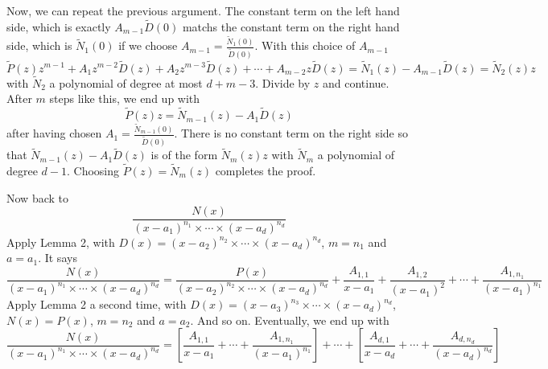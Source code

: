 Now, we can repeat the previous argument. The constant term on the left hand side, which
is exactly $A_{m-1} \tilde{D}(0)$ matchs the constant term on the right hand side, which is $\tilde{N}_1(0)$ if we
choose $A_{m-1} = \frac{\tilde{N}_1(0)}{\tilde{D}(0)}$. With this choice of $A_{m-1}$
\[
\tilde{P}(z)z^{m-1} + A_1 z^{m-2} \tilde{D}(z) + A_2 z^{m-3} \tilde{D}(z) + \cdots + A_{m-2} z \tilde{D}(z) = \tilde{N}_1(z) - A_{m-1} \tilde{D}(z) = \tilde{N}_2(z)z
\]
with $\tilde{N}_2$ a polynomial of degree at most $d + m - 3$. Divide by $z$ and continue. After $m$ steps
like this, we end up with
\[
\tilde{P}(z)z = \tilde{N}_{m-1}(z) - A_1 \tilde{D}(z)
\]
after having chosen $A_1 = \frac{\tilde{N}_{m-1}(0)}{\tilde{D}(0)}$. There is no constant term on the right side so that
$\tilde{N}_{m-1}(z) - A_1 \tilde{D}(z)$ is of the form $\tilde{N}_m(z)z$ with $\tilde{N}_m$ a polynomial of degree $d - 1$. Choosing
$\tilde{P}(z) = \tilde{N}_m(z)$ completes the proof.

\bigskip
Now back to
\[
\frac{N(x)}{(x-a_1)^{n_1} \times \cdots \times (x-a_d)^{n_d}}
\]
Apply Lemma 2, with $D(x) = (x - a_2)^{n_2} \times \cdots \times (x - a_d)^{n_d}$, $m = n_1$ and $a = a_1$. It says
\[
\frac{N(x)}{(x-a_1)^{n_1} \times \cdots \times (x-a_d)^{n_d}} = \frac{P(x)}{(x-a_2)^{n_2} \times \cdots \times (x-a_d)^{n_d}} + \frac{A_{1,1}}{x-a_1} + \frac{A_{1,2}}{(x-a_1)^2} + \cdots + \frac{A_{1,n_1}}{(x-a_1)^{n_1}}
\]
Apply Lemma 2 a second time, with $D(x) = (x - a_3)^{n_3} \times \cdots \times (x - a_d)^{n_d}$, $N(x) = P(x)$,
$m = n_2$ and $a = a_2$. And so on. Eventually, we end up with
\[
\frac{N(x)}{(x-a_1)^{n_1} \times \cdots \times (x-a_d)^{n_d}} = \left[ \frac{A_{1,1}}{x-a_1} + \cdots + \frac{A_{1,n_1}}{(x-a_1)^{n_1}} \right] + \cdots + \left[ \frac{A_{d,1}}{x-a_d} + \cdots + \frac{A_{d,n_d}}{(x-a_d)^{n_d}} \right]
\]

\newpage